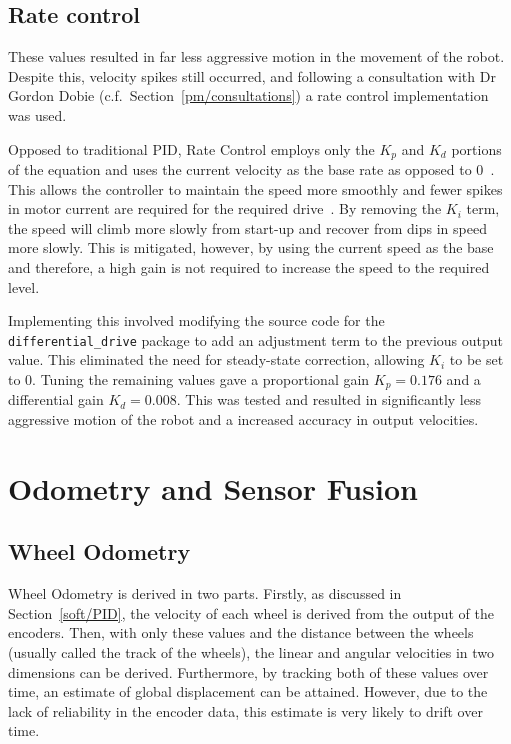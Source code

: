 \subsection{Rate control}\label{soft/PID/rate}

These values resulted in far less aggressive motion in the movement of the
robot. Despite this, velocity spikes still occurred, and following a
consultation with Dr Gordon Dobie (c.f.\ Section~\ref{pm/consultations}) a
rate control implementation was used.

Opposed to traditional PID, Rate Control employs only the $K_p$ and $K_d$ portions of
the equation and uses the current velocity as the base rate as opposed to 0~\cite{koditschek1987quadratic}. This allows the controller to maintain the speed
more smoothly and fewer spikes in motor current are required for the required
drive~\cite{kawamura1988local}. By removing the $K_i$ term, the speed will climb
more slowly from start-up and recover from dips in speed more slowly. This is
mitigated, however, by using the current speed as the base and therefore, a high
gain is not required to increase the speed to the required level.

Implementing this involved modifying the source
code for the \verb|differential_drive| package to add an adjustment term to the
previous output value. This eliminated the need for steady-state correction,
allowing $K_i$ to be set to $0$. Tuning the remaining values gave a proportional
gain $K_p = 0.176$ and a differential gain $K_d = 0.008$. This was tested and
resulted in significantly less aggressive motion of the robot and a increased
accuracy in output velocities.



\section{Odometry and Sensor Fusion}\label{soft/odometry}

\subsection{Wheel Odometry}\label{soft/odometry/wheel}

Wheel Odometry is derived in two parts. Firstly, as discussed in Section~\ref{soft/PID}, the velocity of each wheel is derived from the output of the
encoders. Then, with only these values and the distance between the wheels
(usually called the track of the wheels), the linear and angular velocities in two
dimensions can be derived. Furthermore, by tracking both of these values over
time, an estimate of global displacement can be attained. However, due to the lack
of reliability in the encoder data, this estimate is very likely to drift over
time.

